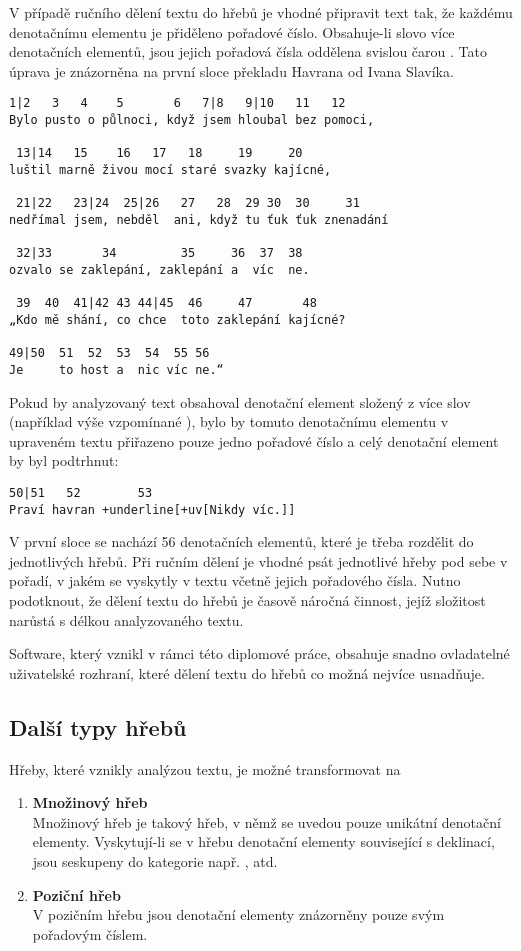 \documentclass[dp.tex]{subfiles}
\begin{document}
V případě ručního dělení textu do hřebů je vhodné připravit text tak, že každému denotačnímu elementu je přiděleno pořadové číslo. Obsahuje-li slovo více denotačních elementů, jsou jejich pořadová čísla oddělena svislou čarou \uv{|}. Tato úprava je znázorněna na první sloce překladu Havrana od Ivana Slavíka.

\begin{samepage}
\begin{Verbatim}[commandchars=+\[\]]
 1|2   3   4    5       6   7|8   9|10   11   12
Bylo pusto o půlnoci, když jsem hloubal bez pomoci,

 13|14   15    16   17   18     19     20
luštil marně živou mocí staré svazky kajícné,

 21|22   23|24  25|26   27   28  29 30  30     31
nedřímal jsem, nebděl  ani, když tu ťuk ťuk znenadání

 32|33       34         35     36  37  38
ozvalo se zaklepání, zaklepání a  víc  ne.

 39  40  41|42 43 44|45  46     47       48
„Kdo mě shání, co chce  toto zaklepání kajícné?

49|50  51  52  53  54  55 56
Je     to host a  nic víc ne.“
\end{Verbatim}
\end{samepage}

Pokud by analyzovaný text obsahoval denotační element složený z více slov (například výše vzpomínané ), bylo by tomuto denotačnímu elementu v upraveném textu přiřazeno pouze jedno pořadové číslo a celý denotační element by byl podtrhnut:
\begin{Verbatim}[commandchars=+\[\]]
50|51   52        53
Praví havran +underline[+uv[Nikdy víc.]]
\end{Verbatim}

V první sloce se nachází 56 denotačních elementů, které je třeba rozdělit do jednotlivých hřebů. Při ručním dělení je vhodné psát jednotlivé hřeby pod sebe v pořadí, v jakém se vyskytly v textu včetně jejich pořadového čísla. Nutno podotknout, že dělení textu do hřebů je časově náročná činnost, jejíž složitost narůstá s délkou analyzovaného textu.

Software, který vznikl v rámci této diplomové práce, obsahuje snadno ovladatelné uživatelské rozhraní, které dělení textu do hřebů co možná nejvíce usnadňuje.

\subsection{Další typy hřebů}
Hřeby, které vznikly analýzou textu, je možné transformovat na
\begin{enumerate}
\item \textbf{Množinový hřeb}\\
Množinový hřeb je takový hřeb, v němž se uvedou pouze unikátní denotační elementy. Vyskytují-li se v hřebu denotační elementy související s deklinací, jsou seskupeny do kategorie např. ,  atd.
\item \textbf{Poziční hřeb}\\
V pozičním hřebu jsou denotační elementy znázorněny pouze svým pořadovým číslem.
\end{enumerate}
\end{document}
